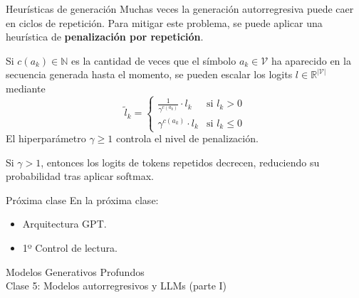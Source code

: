 \documentclass{beamer}
\newcommand{\R}{\mathbb{R}}
\newcommand{\N}{\mathbb{N}}
\begin{document}
\begin{frame}{Heurísticas de generación}
    Muchas veces la generación autorregresiva puede caer en ciclos de repetición. Para mitigar este problema, se puede aplicar una heurística de \textbf{penalización por repetición}.

    Si $c(a_k)\in\N$ es la cantidad de veces que el símbolo $a_k\in\mathcal{V}$ ha aparecido en la secuencia generada hasta el momento, se pueden escalar los logits $l\in\R^{|\mathcal{V}|}$ mediante
    \begin{equation*}
        \tilde{l}_k=
        \begin{cases}
            \frac{1}{\gamma^{c(a_k)}} \cdot l_k   & \text{si } l_k>0    \\
            \gamma^{c(a_k)} \cdot l_k & \text{si } l_k\leq 0
        \end{cases}
    \end{equation*}
    El hiperparámetro $\gamma\geq1$ controla el nivel de penalización.

    Si $\gamma>1$, entonces los logits de tokens repetidos decrecen, reduciendo su probabilidad tras aplicar softmax.
\end{frame}

\begin{frame}{Próxima clase}
    En la próxima clase:
    \begin{itemize}
        \item Arquitectura GPT.
        \item 1º Control de lectura.
    \end{itemize}
\end{frame}

\begin{frame}
    \centering
    \Large{Modelos Generativos Profundos}\\
    \large{Clase 5: Modelos autorregresivos y LLMs (parte I)}
\end{frame}
\end{document}
